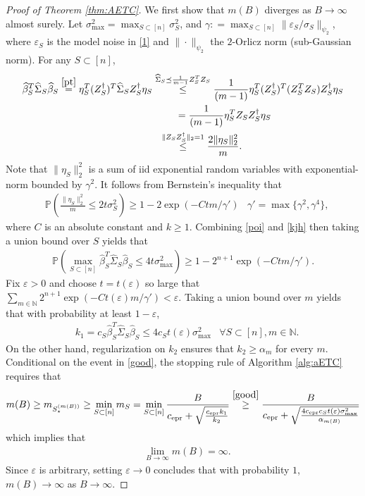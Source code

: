 \documentclass[a4paper,11pt]{article}
\numberwithin{equation}{section}
\theoremstyle{plain}
\theoremstyle{definition}
\def\N{{\mathbb N}}
\def\P{{\mathbb P}}
\def\e{{\varepsilon}}
\def\ex{{\text{epr}}}
\begin{document}
\begin{proof}[Proof of Theorem \ref{thm:AETC}]
We first show that $m(B)$ diverges as $B\to\infty$ almost surely. 
Let $\sigma_{\max}^2 = \max_{S\subset [n]}\sigma_S^2$, and $\gamma: = \max_{S\subset [n]}\|\e_S/\sigma_S\|_{\psi_2}$, where $\e_S$ is the model noise in \eqref{1} and $\|\cdot\|_{\psi_2}$ the $2$-Orlicz norm (sub-Gaussian norm).     
For any $S\subset [n]$, 
\begin{align}
\widehat{\beta}_S^T\widehat{\Sigma}_S\widehat{\beta}_S \stackrel{\eqref{pt}}{=} \eta_S^T(Z_S^\dagger)^T\widehat{\Sigma}_SZ_S^\dagger\eta_S\nonumber&\stackrel{\widehat{\Sigma}_S\preceq \frac{1}{m-1}Z_S^TZ_S}{\leq}\frac{1}{(m-1)}\eta_S^T(Z_S^\dagger)^T(Z_S^TZ_S)Z_S^\dagger\eta_S\nonumber\\
&\ \ \ \ \ \ \ = \frac{1}{(m-1)}\eta_S^TZ_SZ_S^\dagger\eta_S\nonumber\\
&\ \  \stackrel{\|Z_SZ_S^\dagger\|_2 = 1}{\leq} \frac{2\|\eta_S\|_2^2}{m}.\label{kjh}
\end{align}
Note that $\|\eta_S\|_2^2$ is a sum of iid exponential random variables with exponential-norm bounded by $\gamma^2$. 
It follows from Bernstein's inequality \cite[Corollary 2.8.3]{Vershynin_2018} that 
\begin{align}
&\P\left(\frac{\|\eta_S\|_2^2}{m}\leq 2t\sigma_S^2\right)\geq 1-2\exp\left(-Ctm/\gamma'\right)&\gamma' = \max\{\gamma^2, \gamma^4\},\label{poi} 
\end{align}
where $C$ is an absolute constant and $k\geq 1$. 
Combining \eqref{poi} and \eqref{kjh} then taking a union bound over $S$ yields that 
\begin{align*}
\P\left(\max_{S\subset [n]}\widehat{\beta}_S^T\widehat{\Sigma}_S\widehat{\beta}_S\leq 4t\sigma_{\max}^2\right)\geq 1-2^{n+1}\exp\left(-Ctm/\gamma'\right). 
\end{align*}
Fix $\e>0$ and choose $t= t(\e)$ so large that $\sum_{m\in\N}2^{n+1}\exp\left(-Ct(\e)m/\gamma'\right)<\e$. 
Taking a union bound over $m$ yields that with probability at least $1-\e$,  
\begin{align}
&k_1 = c_S\widehat{\beta}_S^T\widehat{\Sigma}_S\widehat{\beta}_S\leq 4c_St(\e)\sigma_{\max}^2&\forall S\subset [n], m\in\N.\label{good}
\end{align}
On the other hand, regularization on $k_2$ ensures that $k_2\geq\alpha_m$ for every $m$. 
Conditional on the event in \eqref{good}, the stopping rule of Algorithm \ref{alg:aETC} requires that 
\begin{align*}
m(B)\geq m_{S_\star^{(m(B))}}\geq\min_{S\subset [n]}m_{S} = \min_{S\subset [n]}\frac{B}{c_{\ex}+\sqrt{\frac{c_{\ex}k_1}{k_2}}}\stackrel{\eqref{good}}{\geq}\frac{B}{c_{\ex}+\sqrt{\frac{4c_{\ex}c_St(\e)\sigma_{\max}^2}{\alpha_{m(B)}}}}
\end{align*} 
which implies that 
\begin{align}
&\lim_{B\to\infty}m(B)=\infty. 
\label{ksl1}
\end{align}
Since $\e$ is arbitrary, setting $\e\to 0$ concludes that with probability $1$, $m(B)\to\infty$ as $B\to\infty$.


\end{proof}
\end{document}
